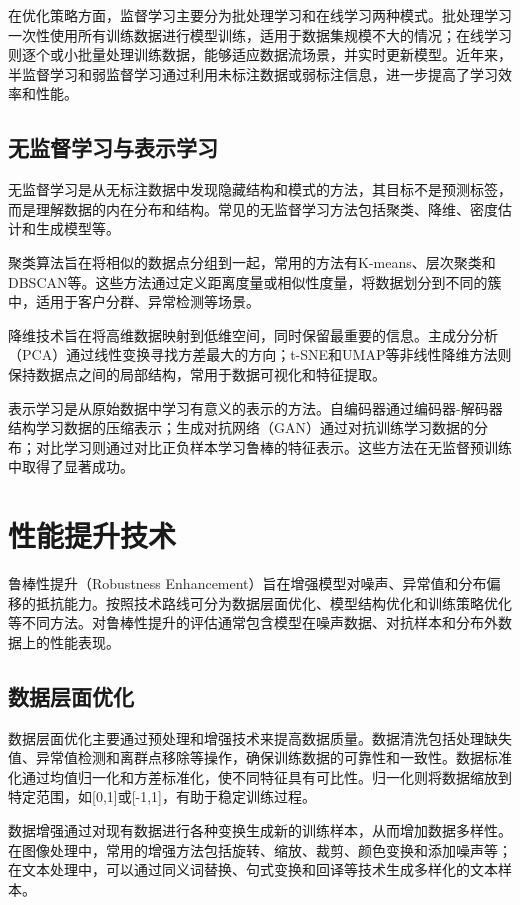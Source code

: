 在优化策略方面，监督学习主要分为批处理学习和在线学习两种模式。批处理学习一次性使用所有训练数据进行模型训练，适用于数据集规模不大的情况；在线学习则逐个或小批量处理训练数据，能够适应数据流场景，并实时更新模型。近年来，半监督学习和弱监督学习通过利用未标注数据或弱标注信息，进一步提高了学习效率和性能。

\subsection{无监督学习与表示学习}\label{sec:ch2-unsupervised}

无监督学习是从无标注数据中发现隐藏结构和模式的方法，其目标不是预测标签，而是理解数据的内在分布和结构。常见的无监督学习方法包括聚类、降维、密度估计和生成模型等。

聚类算法旨在将相似的数据点分组到一起，常用的方法有K-means、层次聚类和DBSCAN等。这些方法通过定义距离度量或相似性度量，将数据划分到不同的簇中，适用于客户分群、异常检测等场景。

降维技术旨在将高维数据映射到低维空间，同时保留最重要的信息。主成分分析（PCA）通过线性变换寻找方差最大的方向；t-SNE和UMAP等非线性降维方法则保持数据点之间的局部结构，常用于数据可视化和特征提取。

表示学习是从原始数据中学习有意义的表示的方法。自编码器通过编码器-解码器结构学习数据的压缩表示；生成对抗网络（GAN）通过对抗训练学习数据的分布；对比学习则通过对比正负样本学习鲁棒的特征表示。这些方法在无监督预训练中取得了显著成功。

\section{性能提升技术}\label{sec:ch2-performance}

鲁棒性提升（Robustness Enhancement）旨在增强模型对噪声、异常值和分布偏移的抵抗能力。按照技术路线可分为数据层面优化、模型结构优化和训练策略优化等不同方法。对鲁棒性提升的评估通常包含模型在噪声数据、对抗样本和分布外数据上的性能表现。

\subsection{数据层面优化}\label{sec:ch2-data}

数据层面优化主要通过预处理和增强技术来提高数据质量。数据清洗包括处理缺失值、异常值检测和离群点移除等操作，确保训练数据的可靠性和一致性。数据标准化通过均值归一化和方差标准化，使不同特征具有可比性。归一化则将数据缩放到特定范围，如[0,1]或[-1,1]，有助于稳定训练过程。

数据增强通过对现有数据进行各种变换生成新的训练样本，从而增加数据多样性。在图像处理中，常用的增强方法包括旋转、缩放、裁剪、颜色变换和添加噪声等；在文本处理中，可以通过同义词替换、句式变换和回译等技术生成多样化的文本样本。

